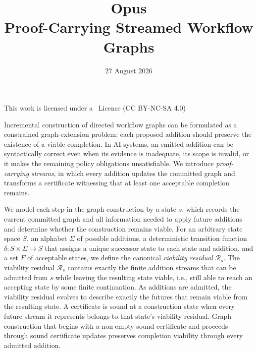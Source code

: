 \documentclass[11pt]{article}
\title{\textbf{Opus}\\[0.15em]
{\Large Proof-Carrying Streamed Workflow Graphs}
}
\author{%
  \OpusAuthorAffiliation{Phillip Kingston\textsuperscript{*}}{Member of Technical Staff}{AppliedAI}%
  \and
  \OpusAuthorAffiliation{Th\'eo Fagnoni}{Member of Technical Staff}{AppliedAI}%
}
\date{27 August 2026}
\makeatletter
\theoremstyle{definition}
\newcommand{\Residual}{\mathcal R}
\renewcommand{\maketitle}{%
  \begingroup
  \setlength{\parskip}{0pt}
  \def\and{\qquad}
  \begin{center}
    {\LARGE\@title\par}
    \vspace{27.77pt}
    {\normalsize\@author\par}
    \vspace{0.35em}
    {\normalsize\@date\par}
    \vspace{0.35em}
    {\ccbyncsa\par}
    \vspace{0.15em}
    {\footnotesize This work is licensed under a
      \OpusLicenseName\ License (CC BY-NC-SA 4.0)\par}
  \end{center}
  \vspace{0.35em}
  \endgroup
}
\renewenvironment{abstract}
  {{\centering\bfseries Abstract\par}%
   \vspace{0.15em}%
   \small
   \setlength{\topsep}{0pt}%
   \quotation
   \setlength{\parskip}{0.2em plus 0.05em}}
  {\endquotation\clearpage}
\makeatother
\begin{document}
\maketitle
\begingroup
\renewcommand{\thefootnote}{}
\endgroup

\begin{abstract}

Incremental construction of directed workflow graphs can be formulated as a constrained graph-extension problem: each proposed addition should preserve the existence of a viable completion. In AI systems, an emitted addition can be syntactically correct even when its evidence is inadequate, its scope is invalid, or it makes the remaining policy obligations unsatisfiable. We introduce \emph{proof-carrying streams}, in which every addition updates the committed graph and transforms a certificate witnessing that at least one acceptable completion remains.

We model each step in the graph construction by a state $s$, which records the current committed graph and all information needed to apply future additions and determine whether the construction remains viable. For an arbitrary state space $S$, an alphabet $\Sigma$ of possible additions, a deterministic transition function $\delta : S \times \Sigma \to S$ that assigns a unique successor state to each state and addition, and a set $F$ of acceptable states, we define the canonical \emph{viability residual} $\Residual_s$. The viability residual $\Residual_s$ contains exactly the finite addition streams that can be admitted from $s$ while leaving the resulting state viable, i.e., still able to reach an accepting state by some finite continuation. As additions are admitted, the viability residual evolves to describe exactly the futures that remain viable from the resulting state. A certificate is sound at a construction state when every future stream it represents belongs to that state's viability residual. Graph construction that begins with a non-empty sound certificate and proceeds through sound certificate updates preserves completion viability through every admitted addition.


\end{abstract}
\end{document}
